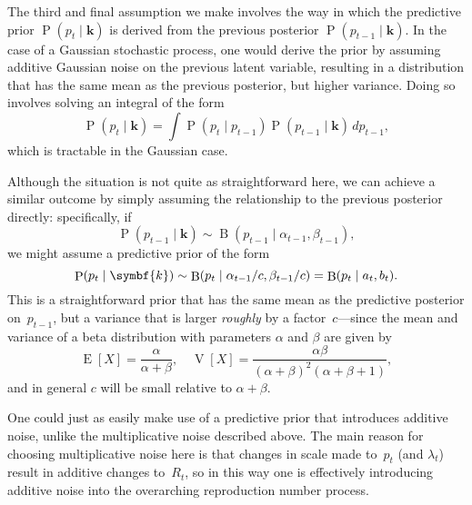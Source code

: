 \documentclass[12pt,a4paper]{article}
\newcommand\ub[1]{\symbf{#1}}                 %
\DeclareMathOperator\Pb{P}                    %
\DeclareMathOperator\Ex{E}                    %
\DeclareMathOperator\Va{V}                    %
\DeclarePairedDelimiter\lr{\lparen}{\rparen}  %
\DeclareMathOperator\B{B}                     %
\begin{document}
The third and final assumption we make involves the way in which the predictive
prior $\Pb(p_t \mid \ub{k})$ is derived from the previous posterior $\Pb(p_{t-1}
\mid \ub{k})$. In the case of a Gaussian stochastic process, one would derive
the prior by assuming additive Gaussian noise on the previous latent variable,
resulting in a distribution that has the same mean as the previous posterior,
but higher variance. Doing so involves solving an integral of the form
\begin{equation*}
  \Pb(p_t \mid \ub{k}) = \int \Pb(p_t \mid p_{t-1})
    \Pb(p_{t-1} \mid \ub{k})\, dp_{t-1},
\end{equation*}
which is tractable in the Gaussian case.

Although the situation is not quite as straightforward here, we can achieve a
similar outcome by simply assuming the relationship to the previous posterior
directly: specifically, if
\begin{equation}\label{eqn:posterior form}
  \Pb(p_{t-1} \mid \ub{k}) \sim \B(p_{t-1} \mid \alpha_{t-1}, \beta_{t-1}),
\end{equation}
we might assume a predictive prior of the form
\begin{equation}\label{eqn:prior}
  \Pb(p_t \mid \ub{k}) \sim \B(p_t \mid \alpha_{t-1}/c, \beta_{t-1}/c)
  = \B\lr*{p_t \mid a_t, b_t}.
\end{equation}
This is a straightforward prior that has the same mean as the predictive
posterior on~$p_{t-1}$, but a variance that is larger \emph{roughly} by a
factor~$c$---since the mean and variance of a beta distribution with parameters
$\alpha$ and $\beta$ are given by
\begin{equation*}
  \Ex[X] = \frac{\alpha}{\alpha + \beta}, \quad
  \Va[X] = \frac{\alpha\beta}{(\alpha + \beta)^2 (\alpha + \beta + 1)},
\end{equation*}
and in general $c$ will be small relative to $\alpha + \beta$.

One could just as easily make use of a predictive prior that introduces additive
noise, unlike the multiplicative noise described above. The main reason for
choosing multiplicative noise here is that changes in scale made to~$p_t$ (and
$\lambda_t$) result in additive changes to~$R_t$, so in this way one is
effectively introducing additive noise into the overarching reproduction number
process.
\end{document}

